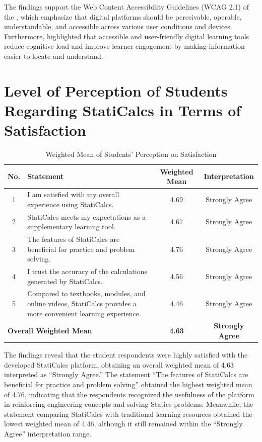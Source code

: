 The findings support the Web Content Accessibility Guidelines (WCAG 2.1) of the \cite{world_wide_web_consortium_w3c_web_nodate}, which emphasize that digital platforms should be perceivable, operable, understandable, and accessible across various user conditions and devices. Furthermore, \cite{hassan_usability_2022} highlighted that accessible and user-friendly digital learning tools reduce cognitive load and improve learner engagement by making information easier to locate and understand.


\section{Level of Perception of Students Regarding StatiCalcs in Terms of Satisfaction}

\begin{table}[H]
\vspace{-1cm}
\centering
\small
\caption{Weighted Mean of Students' Perception on Satisfaction}
\renewcommand{\arraystretch}{1.1}
\begin{tabular}{cp{6cm}cc}
\hline
\textbf{No.} & \textbf{Statement} & \textbf{Weighted Mean} & \textbf{Interpretation}\\
\hline
1 & I am satisfied with my overall experience using StatiCalcs. & 4.69 & Strongly Agree\\
2 & StatiCalcs meets my expectations as a supplementary learning tool. & 4.67 & Strongly Agree\\
3 & The features of StatiCalcs are beneficial for practice and problem solving. & 4.76 & Strongly Agree\\
4 & I trust the accuracy of the calculations generated by StatiCalcs. & 4.56 & Strongly Agree\\
5 & Compared to textbooks, modules, and online videos, StatiCalcs provides a more convenient learning experience. & 4.46 & Strongly Agree\\
\multicolumn{2}{l}{\textbf{Overall Weighted Mean}} & \textbf{4.63} & \textbf{Strongly Agree}\\
\hline
\end{tabular}
\end{table}

The findings reveal that the student respondents were highly satisfied with the developed StatiCalcs platform, obtaining an overall weighted mean of 4.63 interpreted as ``Strongly Agree.'' The statement ``The features of StatiCalcs are beneficial for practice and problem solving'' obtained the highest weighted mean of 4.76, indicating that the respondents recognized the usefulness of the platform in reinforcing engineering concepts and solving Statics problems. Meanwhile, the statement comparing StatiCalcs with traditional learning resources obtained the lowest weighted mean of 4.46, although it still remained within the ``Strongly Agree'' interpretation range.

